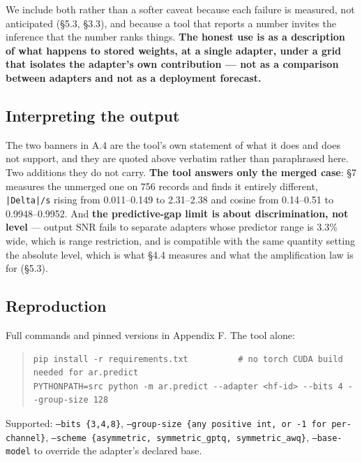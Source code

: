 We include both rather than a softer caveat because each failure is measured, not anticipated (\S{}5.3, \S{}3.3), and because a tool that reports a number invites the inference that the number ranks things. \textbf{The honest use is as a description of what happens to stored weights, at a single adapter, under a grid that isolates the adapter's own contribution --- not as a comparison between adapters and not as a deployment forecast.}

\subsection{Interpreting the output}

The two banners in A.4 are the tool's own statement of what it does and does not support, and they are quoted above verbatim rather than paraphrased here. Two additions they do not carry. \textbf{The tool answers only the merged case}: \S{}7 measures the unmerged one on 756 records and finds it entirely different, \texttt{|Delta|/\allowbreak{}s} rising from 0.011--0.149 to 2.31--2.38 and cosine from 0.14--0.51 to 0.9948--0.9952. And \textbf{the predictive-gap limit is about discrimination, not level} --- output SNR fails to separate adapters whose predictor range is 3.3\% wide, which is range restriction, and is compatible with the same quantity setting the absolute level, which is what \S{}4.4 measures and what the amplification law is for (\S{}5.3).

\subsection{Reproduction}

Full commands and pinned versions in Appendix F. The tool alone:

\begin{quote}\tiny\begin{verbatim}
pip install -r requirements.txt          # no torch CUDA build needed for ar.predict
PYTHONPATH=src python -m ar.predict --adapter <hf-id> --bits 4 --group-size 128
\end{verbatim}\end{quote}

Supported: \texttt{--\allowbreak{}bits \{3,4,8\}}, \texttt{--\allowbreak{}group-\allowbreak{}size \{any positive int, or -\allowbreak{}1 for per-\allowbreak{}channel\}}, \texttt{--\allowbreak{}scheme \{asymmetric, symmetric\_\allowbreak{}gptq, symmetric\_\allowbreak{}awq\}}, \texttt{--\allowbreak{}base-\allowbreak{}model} to override the adapter's declared base.


